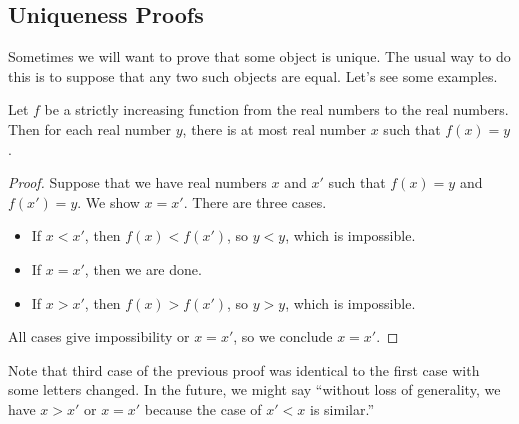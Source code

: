 \documentclass[../main.tex]{subfiles}
\begin{document}
\subsection{Uniqueness Proofs}
Sometimes we will want to prove that some object is unique. The usual way to do this is to suppose that any two such objects are equal. Let's see some examples.
\begin{example} \label{exe:increasing-is-injective}
    Let $f$ be a strictly increasing function from the real numbers to the real numbers. Then for each real number $y$, there is at most real number $x$ such that $f(x)=y$.
\end{example}
\begin{proof}
    Suppose that we have real numbers $x$ and $x'$ such that $f(x)=y$ and $f(x')=y$. We show $x=x'$. There are three cases.
    \begin{itemize}
        \item If $x<x'$, then $f(x)<f(x')$, so $y<y$, which is impossible.
        \item If $x=x'$, then we are done.
        \item If $x>x'$, then $f(x)>f(x')$, so $y>y$, which is impossible.
    \end{itemize}
    All cases give impossibility or $x=x'$, so we conclude $x=x'$.
\end{proof}
Note that third case of the previous proof was identical to the first case with some letters changed. In the future, we might say ``without loss of generality, we have $x>x'$ or $x=x'$ because the case of $x'<x$ is similar.''
\end{document}
